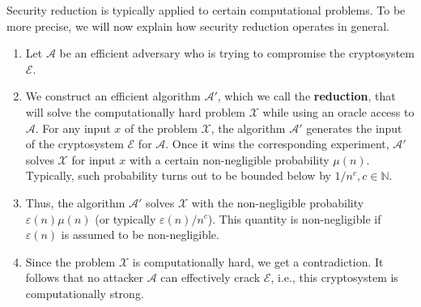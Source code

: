 \documentclass[../lecture-notes-148x210.tex]{subfiles}
\begin{document}
Security reduction is typically applied to certain computational problems. To be more precise, 
we will now explain how security reduction operates in general.
\begin{definition} 
    \hfill
    \begin{enumerate}
        \item Let $\mathcal{A}$ be an efficient adversary who is trying to
        compromise the cryptosystem $\mathcal{E}$.
        \item We construct an efficient algorithm $\mathcal{A}'$, which we call the
        \textbf{reduction}, that will solve the computationally hard problem
        $\mathcal{X}$ while using an oracle access to $\mathcal{A}$. For any
        input $x$ of the problem $\mathcal{X}$, the algorithm $\mathcal{A}'$
        generates the input of the cryptosystem $\mathcal{E}$ for $\mathcal{A}$.
        Once it wins the corresponding experiment, $\mathcal{A}'$ solves
        $\mathcal{X}$ for input $x$ with a certain non-negligible probability
        $\mu(n)$. Typically, such probability turns out to be bounded below by
        $1/n^c, c \in \mathbb{N}$.
        \item Thus, the algorithm $\mathcal{A}'$ solves $\mathcal{X}$ with the
        non-negligible probability $\varepsilon(n)\mu(n)$ (or typically
        $\varepsilon(n)/n^c$). This quantity is non-negligible 
        if $\varepsilon(n)$ is assumed to be non-negligible.
        \item Since the problem $\mathcal{X}$ is computationally hard, we get a
        contradiction. It follows that no attacker $\mathcal{A}$ can effectively
        crack $\mathcal{E}$, i.e., this cryptosystem is computationally strong.
    \end{enumerate}
\end{definition}



\end{document}
